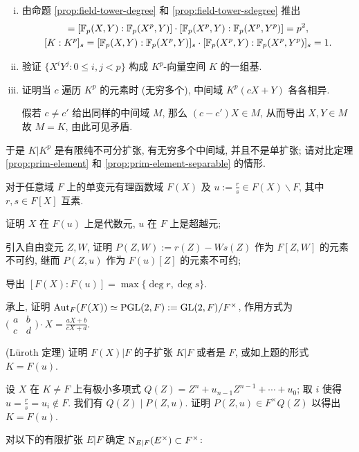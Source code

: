 \begin{Exercises}
\begin{enumerate}[(i)]
			\item 由命题 \ref{prop:field-tower-degree} 和 \ref{prop:field-tower-sdegree} 推出
				\begin{gather*}
					[K:K^p] = [\F_p(X,Y):\F_p(X^p,Y)] \cdot [\F_p(X^p,Y):\F_p(X^p,Y^p)] = p^2, \\
					[K:K^p]_s = [\F_p(X,Y):\F_p(X^p,Y)]_s \cdot [\F_p(X^p,Y):\F_p(X^p,Y^p)]_s = 1.
				\end{gather*}
			\item 验证 $\{ X^i Y^j: 0 \leq i,j < p \}$ 构成 $K^p$-向量空间 $K$ 的一组基.
			\item 证明当 $c$ 遍历 $K^p$ 的元素时 (无穷多个), 中间域 $K^p(cX + Y)$ 各各相异.
			\begin{hint} 假若 $c \neq c'$ 给出同样的中间域 $M$, 那么 $(c-c')X \in M$, 从而导出 $X,Y \in M$ 故 $M = K$, 由此可见矛盾. \end{hint}
		\end{enumerate}
		于是 $K|K^p$ 是有限纯不可分扩张, 有无穷多个中间域, 并且不是单扩张; 请对比定理 \ref{prop:prim-element} 和 \ref{prop:prim-element-separable} 的情形.
	\item 对于任意域 $F$ 上的单变元有理函数域 $F(X)$ 及 $u := \frac{r}{s} \in F(X) \smallsetminus F$, 其中 $r,s \in F[X]$ 互素.
		\begin{compactenum}[(i)]
			\item 证明 $X$ 在 $F(u)$ 上是代数元, $u$ 在 $F$ 上是超越元;
			\item 引入自由变元 $Z, W$, 证明 $P(Z,W) := r(Z) - Ws(Z)$ 作为 $F[Z,W]$ 的元素不可约, 继而 $P(Z,u)$ 作为 $F(u)[Z]$ 的元素不可约;
			\item 导出 $[F(X):F(u)] = \max\{\deg r, \deg s\}$.
		\end{compactenum}
	\item 承上, 证明 $\operatorname{Aut}_F(F(X)) \simeq \operatorname{PGL}(2,F) := \operatorname{GL}(2,F)/F^\times$, 作用方式为 $\bigl( \begin{smallmatrix} a & b \\ c & d \end{smallmatrix} \bigr) \cdot X = \frac{aX+b}{cX+d}$.
	\item (Lüroth 定理) 证明 $F(X)|F$ 的子扩张 $K|F$ 或者是 $F$, 或如上题的形式 $K=F(u)$. 
	\begin{hint}
		设 $X$ 在 $K \neq F$ 上有极小多项式 $Q(Z) = Z^n + u_{n-1} Z^{n-1} + \cdots + u_0$; 取 $i$ 使得 $u = \frac{r}{s} = u_i \notin F$. 我们有 $Q(Z) \mid P(Z,u)$. 证明 $P(Z,u) \in F^\times Q(Z)$ 以得出 $K=F(u)$.
	\end{hint}
	\item 对以下的有限扩张 $E|F$ 确定 $\operatorname{N}_{E|F}(E^\times) \subset F^\times$:

\end{Exercises}
